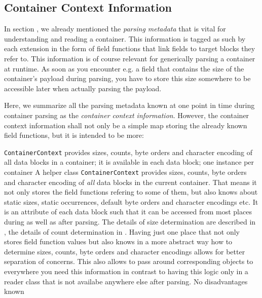 \subsection{Container Context Information}%
\label{sec:ContainerContextInformation}%

In section , we already mentioned the \emph{parsing metadata} that is vital for understanding and reading a container. This information is tagged as such by each extension in the form of field functions that link fields to target blocks they refer to. This information is of course relevant for generically parsing a container at runtime. As soon as you encounter e.g. a field that contains the size of the container's payload during parsing, you have to store this size somewhere to be accessible later when actually parsing the payload.

Here, we summarize all the parsing metadata known at one point in time during container parsing as the \emph{container context information}. However, the container context information shall not only be a simple map storing the already known field functions, but it is intended to be more:

{%
\texttt{ContainerContext} provides sizes, counts, byte orders and character encoding of all data blocks in a container; it is available in each data block; one instance per container
}
{%
A helper class \texttt{ContainerContext} provides sizes, counts, byte orders and character encoding of \emph{all} data blocks in the current container. That means it not only stores the field functions refering to some of them, but also knows about static sizes, static occurrences, default byte orders and character encodings etc. It is an attribute of each data block such that it can be accessed from most places during as well as after parsing. The details of size determination are described in , the details of count determination in .
}
{%
Having just one place that not only stores field function values but also knows in a more abstract way how to determine sizes, counts, byte orders and character encodings allows for better separation of concerns. This also allows to pass around corresponding objects to everywhere you need this information in contrast to having this logic only in a reader class that is not availabe anywhere else after parsing.
}
{%
No disadvantages known
}

